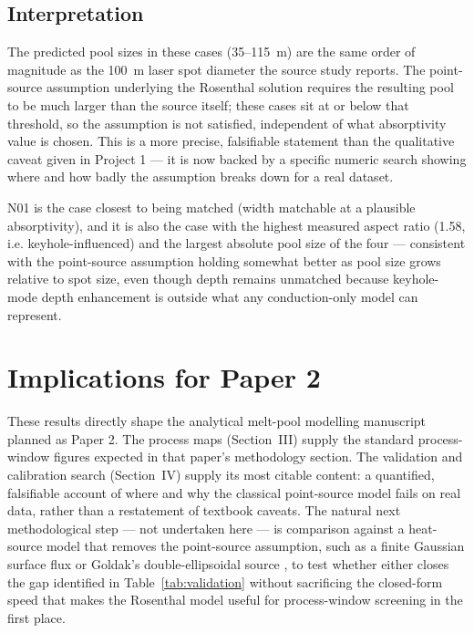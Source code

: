 \documentclass[10pt,journal]{IEEEtran}
\begin{document}
\subsection{Interpretation}

The predicted pool sizes in these cases (35--115~\textmu m) are the same order of magnitude as the 100~\textmu m laser spot diameter the source study reports. The point-source assumption underlying the Rosenthal solution requires the resulting pool to be much larger than the source itself; these cases sit at or below that threshold, so the assumption is not satisfied, independent of what absorptivity value is chosen. This is a more precise, falsifiable statement than the qualitative caveat given in Project 1 --- it is now backed by a specific numeric search showing where and how badly the assumption breaks down for a real dataset.

N01 is the case closest to being matched (width matchable at a plausible absorptivity), and it is also the case with the highest measured aspect ratio (1.58, i.e. keyhole-influenced) and the largest absolute pool size of the four --- consistent with the point-source assumption holding somewhat better as pool size grows relative to spot size, even though depth remains unmatched because keyhole-mode depth enhancement is outside what any conduction-only model can represent.

\section{Implications for Paper 2}

These results directly shape the analytical melt-pool modelling manuscript planned as Paper 2. The process maps (Section~III) supply the standard process-window figures expected in that paper's methodology section. The validation and calibration search (Section~IV) supply its most citable content: a quantified, falsifiable account of where and why the classical point-source model fails on real data, rather than a restatement of textbook caveats. The natural next methodological step --- not undertaken here --- is comparison against a heat-source model that removes the point-source assumption, such as a finite Gaussian surface flux or Goldak's double-ellipsoidal source \cite{goldak1984}, to test whether either closes the gap identified in Table~\ref{tab:validation} without sacrificing the closed-form speed that makes the Rosenthal model useful for process-window screening in the first place.
\end{document}
